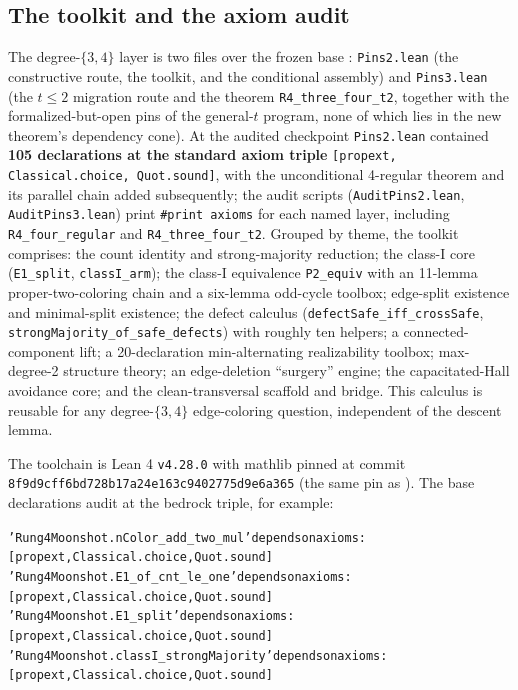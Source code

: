 \documentclass[11pt]{article}
\theoremstyle{definition}
\theoremstyle{remark}
\begin{document}
\subsection{The toolkit and the axiom audit}\label{33-toolkit-audit}

The degree-$\{3,4\}$ layer is two files over the frozen base \cite{E5}: \texttt{Pins2.lean} (the constructive route, the toolkit, and the conditional assembly) and \texttt{Pins3.lean} (the $t \le 2$ migration route and the theorem \texttt{R4\_three\_four\_t2}, together with the formalized-but-open pins of the general-$t$ program, none of which lies in the new theorem's dependency cone). At the audited checkpoint \texttt{Pins2.lean} contained \textbf{105 declarations at the standard axiom triple} \texttt{[propext, Classical.choice, Quot.sound]}, with the unconditional 4-regular theorem and its parallel chain added subsequently; the audit scripts (\texttt{AuditPins2.lean}, \texttt{AuditPins3.lean}) print \texttt{\#print axioms} for each named layer, including \texttt{R4\_four\_regular} and \texttt{R4\_three\_four\_t2}. Grouped by theme, the toolkit comprises: the count identity and strong-majority reduction; the class-I core (\texttt{E1\_split}, \texttt{classI\_arm}); the class-I equivalence \texttt{P2\_equiv} with an 11-lemma proper-two-coloring chain and a six-lemma odd-cycle toolbox; edge-split existence and minimal-split existence; the defect calculus (\texttt{defectSafe\_iff\_crossSafe}, \texttt{strongMajority\_of\_safe\_defects}) with roughly ten helpers; a connected-component lift; a 20-declaration min-alternating realizability toolbox; max-degree-2 structure theory; an edge-deletion ``surgery'' engine; the capacitated-Hall avoidance core; and the clean-transversal scaffold and bridge. This calculus is reusable for any degree-$\{3,4\}$ edge-coloring question, independent of the descent lemma.

\smallskip
The toolchain is Lean 4 \texttt{v4.28.0} with mathlib pinned at commit \texttt{8f9d9cff6bd728b17a24e163c9402775d9e6a365} (the same pin as \cite{E5}). The base declarations audit at the bedrock triple, for example:

{\small
\begin{alltt}
'Rung4Moonshot.nColor_add_two_mul' depends on axioms:
  [propext, Classical.choice, Quot.sound]
'Rung4Moonshot.E1_of_cnt_le_one' depends on axioms:
  [propext, Classical.choice, Quot.sound]
'Rung4Moonshot.E1_split' depends on axioms:
  [propext, Classical.choice, Quot.sound]
'Rung4Moonshot.classI_strongMajority' depends on axioms:
  [propext, Classical.choice, Quot.sound]
\end{alltt}
}
\end{document}
